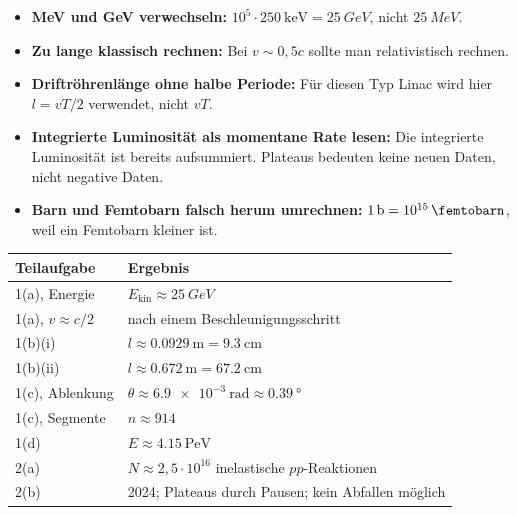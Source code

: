 \documentclass[11pt,a4paper]{scrartcl}
\newcommand{\MeV}{\si{MeV}}
\newcommand{\GeV}{\si{GeV}}
\theoremstyle{definition}
\theoremstyle{plain}
\theoremstyle{remark}
\begin{document}
\begin{learningbox}[title=Typische Denkfehler]
\begin{itemize}
    \item \textbf{MeV und GeV verwechseln:} \(10^5\cdot\SI{250}{\kilo\electronvolt}=\SI{25}{\GeV}\), nicht \(\SI{25}{\MeV}\).
    \item \textbf{Zu lange klassisch rechnen:} Bei \(v\sim0{,}5c\) sollte man relativistisch rechnen.
    \item \textbf{Driftröhrenlänge ohne halbe Periode:} Für diesen Typ Linac wird hier \(l=vT/2\) verwendet, nicht \(vT\).
    \item \textbf{Integrierte Luminosität als momentane Rate lesen:} Die integrierte Luminosität ist bereits aufsummiert. Plateaus bedeuten keine neuen Daten, nicht negative Daten.
    \item \textbf{Barn und Femtobarn falsch herum umrechnen:} \(1\,\si{\barn}=10^{15}\,\si{\femtobarn}\), weil ein Femtobarn kleiner ist.
\end{itemize}
\end{learningbox}

\begin{summarybox}[title=Endergebnisse]
\begin{center}
\begin{tabularx}{\textwidth}{@{}lX@{}}
\toprule
Teilaufgabe & Ergebnis \\
\midrule
1(a), Energie & \(E_{\mathrm{kin}}\approx\SI{25}{\GeV}\) \\
1(a), \(v\approx c/2\) & nach einem Beschleunigungsschritt \\
1(b)(i) & \(l\approx\SI{0,0929}{\metre}=\SI{9,3}{\centi\metre}\) \\
1(b)(ii) & \(l\approx\SI{0,672}{\metre}=\SI{67,2}{\centi\metre}\) \\
1(c), Ablenkung & \(\theta\approx\SI{6,9e-3}{\radian}\approx\SI{0,39}{\degree}\) \\
1(c), Segmente & \(n\approx914\) \\
1(d) & \(E\approx\SI{4,15}{\peta\electronvolt}\) \\
2(a) & \(N\approx2{,}5\cdot10^{16}\) inelastische \(pp\)-Reaktionen \\
2(b) & 2024; Plateaus durch Pausen; kein Abfallen möglich \\
\bottomrule
\end{tabularx}
\end{center}
\end{summarybox}
\end{document}
